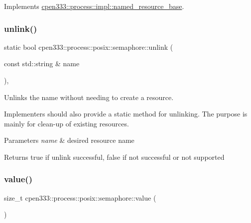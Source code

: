 Implements \hyperlink{classcpen333_1_1process_1_1impl_1_1named__resource__base_ae4033f82dfd068b917a9bca57d3a0c45}{cpen333\+::process\+::impl\+::named\+\_\+resource\+\_\+base}.

\mbox{\label{classcpen333_1_1process_1_1posix_1_1semaphore_ab1399175014f674484217be6d465e878}} 
\subsubsection{\texorpdfstring{unlink()}{unlink()}\hspace{0.1cm}{\footnotesize\ttfamily [2/2]}}
{\footnotesize\ttfamily static bool cpen333\+::process\+::posix\+::semaphore\+::unlink (\begin{DoxyParamCaption}\item[{const std\+::string \&}]{name }\end{DoxyParamCaption})\hspace{0.3cm}{\ttfamily [inline]}, {\ttfamily [static]}}



Unlinks the name without needing to create a resource. 

Implementers should also provide a static method for unlinking. The purpose is mainly for clean-\/up of existing resources.


\begin{DoxyParams}{Parameters}
{\em name} & desired resource name \\
\hline
\end{DoxyParams}
\begin{DoxyReturn}{Returns}
{\ttfamily true} if unlink successful, {\ttfamily false} if not successful or not supported 
\end{DoxyReturn}
\mbox{\label{classcpen333_1_1process_1_1posix_1_1semaphore_a336211ff42ee9da6315c76104840fa98}} 
\subsubsection{\texorpdfstring{value()}{value()}}
{\footnotesize\ttfamily size\+\_\+t cpen333\+::process\+::posix\+::semaphore\+::value (\begin{DoxyParamCaption}{ }\end{DoxyParamCaption})\hspace{0.3cm}{\ttfamily [inline]}}



